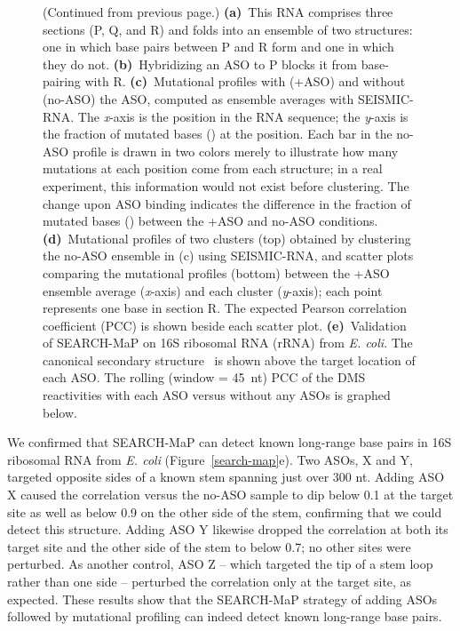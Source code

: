 \documentclass[main.tex]{subfiles}
\begin{document}
\begin{figure}[H]
	\caption[]{(Continued from previous page.) \textbf{(a)}~This RNA comprises three sections (P, Q, and R) and folds into an ensemble of two structures: one in which base pairs between P and R form and one in which they do not. \textbf{(b)}~Hybridizing an ASO to P blocks it from base-pairing with R. \textbf{(c)}~Mutational profiles with (+ASO) and without (no-ASO) the ASO, computed as ensemble averages with SEISMIC-RNA. The \textit{x}-axis is the position in the RNA sequence; the \textit{y}-axis is the fraction of mutated bases (\textmu) at the position. Each bar in the no-ASO profile is drawn in two colors merely to illustrate how many mutations at each position come from each structure; in a real experiment, this information would not exist before clustering. The change upon ASO binding indicates the difference in the fraction of mutated bases (\textDelta\textmu) between the +ASO and no-ASO conditions. \textbf{(d)}~Mutational profiles of two clusters (top) obtained by clustering the no-ASO ensemble in (c) using SEISMIC-RNA, and scatter plots comparing the mutational profiles (bottom) between the +ASO ensemble average (\textit{x}-axis) and each cluster (\textit{y}-axis); each point represents one base in section R. The expected Pearson correlation coefficient (PCC) is shown beside each scatter plot. \textbf{(e)}~Validation of SEARCH-MaP on 16S ribosomal RNA (rRNA) from \textit{E. coli}. The canonical secondary structure~\cite{Cannone2002} is shown above the target location of each ASO. The rolling (window = 45~nt) PCC of the DMS reactivities with each ASO versus without any ASOs is graphed below.}
\end{figure}

We confirmed that SEARCH-MaP can detect known long-range base pairs in 16S ribosomal RNA from \textit{E. coli} (Figure~\ref{search-map}e).
Two ASOs, X and Y, targeted opposite sides of a known stem spanning just over 300 nt.
Adding ASO X caused the correlation versus the no-ASO sample to dip below 0.1 at the target site as well as below 0.9 on the other side of the stem, confirming that we could detect this structure.
Adding ASO Y likewise dropped the correlation at both its target site and the other side of the stem to below 0.7; no other sites were perturbed.
As another control, ASO Z -- which targeted the tip of a stem loop rather than one side -- perturbed the correlation only at the target site, as expected.
These results show that the SEARCH-MaP strategy of adding ASOs followed by mutational profiling can indeed detect known long-range base pairs.
\end{document}
